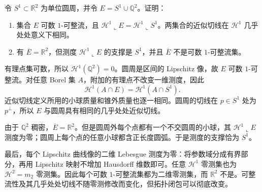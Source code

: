 \begin{exercise}\label{b1:ex:19-null-addition-topology}
令 \(S^1\subset\mathbb R^2\) 为单位圆周，并令 \(E=S^1\cup\mathbb Q^2\)。证明：
\begin{enumerate}
\item\label{b1:item:19-null-addition-measure}
集合 \(E\) 可数 \(1\)-可整流，且 \(\mathcal H^1\llcorner E=\mathcal H^1\llcorner S^1\)。两集合的近似切线在 \(\mathcal H^1\) 几乎处处意义下相同。
\item\label{b1:item:19-null-addition-closure}
有 \(\overline E=\mathbb R^2\)，但测度 \(\mathcal H^1\llcorner E\) 的支撑是 \(S^1\)，并且 \(\overline E\) 不是可数 \(1\)-可整流集。
\end{enumerate}
\end{exercise}
\begin{solution}
有理点集可数，所以 \(\mathcal H^1(\mathbb Q^2)=0\)。圆周是区间的 Lipschitz 像，故 \(E\) 可数 \(1\)-可整流。对任意 Borel 集 \(A\)，附加的有理点不改变一维测度，因此
\[
 \mathcal H^1(A\cap E)=\mathcal H^1(A\cap S^1).
\]
近似切线定义所用的小球质量和锥外质量也逐一相同。圆周的切线在 \(p\in S^1\) 处为 \(p^\perp\)，所以 \(E\) 与圆周具有相同的几乎处处近似切线。

由于 \(\mathbb Q^2\) 稠密，\(\overline E=\mathbb R^2\)。但是圆周外每个点都有一个不交圆周的小球，其 \(\mathcal H^1\llcorner E\) 测度为零；圆周上每个点的任意小球都含正长度圆弧。于是测度的支撑恰为 \(S^1\)。

最后，每个 Lipschitz 曲线像的二维 Lebesgue 测度为零：将参数域分成有界部分，再用 Lipschitz 映射不增加 Hausdorff 维数即可。任意 \(\mathcal H^1\) 零测集也为 \(\mathcal H^2=m_2\) 零测集。因此每个可数 \(1\)-可整流集都为二维零测集，而 \(\mathbb R^2\) 不是。可整流性及其几乎处处切线不随零测修改而变化，但拓扑闭包可以彻底改变。
\end{solution}

